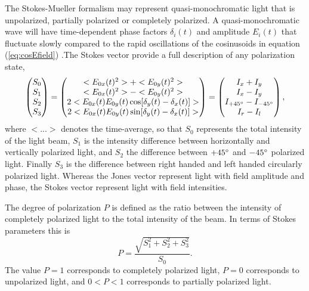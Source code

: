 The Stokes-Mueller formalism may represent quasi-monochromatic light that is unpolarized, partially polarized or completely polarized. A quasi-monochromatic wave will have time-dependent phase factors $\delta_i(t)$ and amplitude $E_i(t)$ that fluctuate slowly compared to the rapid oscillations of the cosinusoids in equation (\ref{eq:cosEfield}) \cite{collett}.The Stokes vector provide a full description of any polarization state\cite{azzam},
\begin{equation}
    \begin{pmatrix}
        S_0 \\
        S_1 \\
        S_2 \\
        S_3
    \end{pmatrix}
    =
    \begin{pmatrix}
        <E_{0x}(t)^2> + <E_{0y}(t)^2> \\
        <E_{0x}(t)^2> - <E_{0y}(t)^2> \\
        2<E_{0x}(t)E_{0y}(t)\cos[\delta_y(t) - \delta_x(t)]> \\
        2<E_{0x}(t)E_{0y}(t)\sin[\delta_y(t) - \delta_x(t)]>
    \end{pmatrix}
    =
    \begin{pmatrix}
        I_x + I_y \\
        I_x - I_y \\
        I_{+45\degree} - I_{-45\degree} \\
        I_r - I_l
    \end{pmatrix},
    \label{eq:StokesVector}
\end{equation}
where $<...>$ denotes the time-average, so that $S_0$ represents the total intensity of the light beam, $S_1$ is the intensity difference between horizontally and vertically polarized light, and $S_2$ the difference between $+45\degree$ and $-45\degree$ polarized light. Finally $S_3$ is the difference between right handed and left handed circularly polarized light.
Whereas the Jones vector represent light with field amplitude and phase, the Stokes vector represent light with field intensities. %

The degree of polarization $P$ is defined as the ratio between the intensity of completely polarized light to the total intensity of the beam. In terms of Stokes parameters this is 
\begin{equation}
    P = \frac{\sqrt{S_1^2 + S_2^2 + S_3^2}}{S_0}.
\end{equation}
The value $P=1$ corresponds to completely polarized light, $P=0$ corresponds to unpolarized light, and $0<P<1$ corresponds to partially polarized light.

